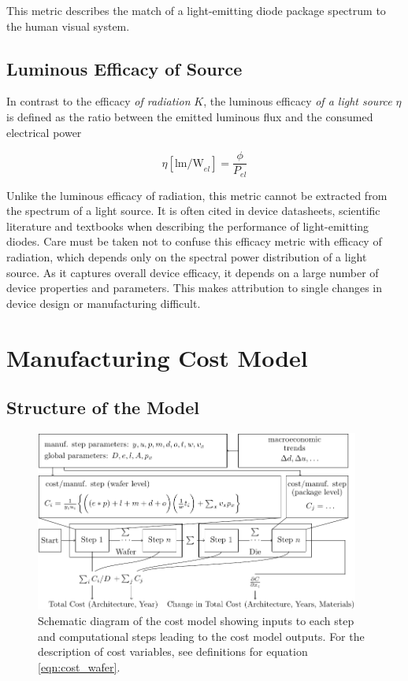 \documentclass[10pt]{article}
\newcounter{defcounter}
\newenvironment{myequation}{%
\addtocounter{equation}{-1}
\refstepcounter{defcounter}
\renewcommand\theequation{SI\thedefcounter}
\begin{equation}}
{\end{equation}}
\begin{document}
This metric describes the match of a light-emitting diode package spectrum to the human visual system.

\subsection{Luminous Efficacy of Source}
\label{subsec:les}

In contrast to the efficacy \textit{of radiation} $K$, the luminous efficacy \textit{of a light source} $\eta$ is defined as the ratio between the emitted luminous flux and the consumed electrical power \cite{cie-term-effsrc}

\begin{myequation}
    \eta [\text{lm/W}_{el}]= \frac{\phi}{P_{el}}
\end{myequation}

Unlike the luminous efficacy of radiation, this metric cannot be extracted from the spectrum of a light source. It is often cited in device datasheets, scientific literature and textbooks when describing the performance of light-emitting diodes. Care must be taken not to confuse this efficacy metric with efficacy of radiation, which depends only on the spectral power distribution of a light source. As it captures overall device efficacy, it depends on a large number of device properties and parameters. This makes attribution to single changes in device design or manufacturing difficult.

\newpage
\section{Manufacturing Cost Model}
\label{sec:costmodel}

\subsection{Structure of the Model}

\begin{figure}[h!]
    \centering
    \includegraphics[width=0.95\textwidth]{./figures/cost_model.pdf}
    \caption{Schematic diagram of the cost model showing inputs to each step and computational steps leading to the cost model outputs. For the description of cost variables, see definitions for equation \cref{eqn:cost_wafer}.}
    \label{fig:costmodel-schematic}
\end{figure}
\end{document}
